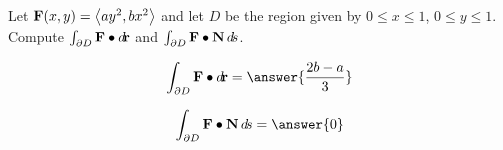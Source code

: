 \documentclass{ximera}
\author{David Guichard \and Neal Koblitz \and H. Jerome Keisler \and Albert Scheller \and Barry Balof \and Mike Wills \and Matthew Carr}
\begin{document}
\begin{exercise}




Let $\mathbf{F}(x,y)=\left\langle ay^2,bx^2\right\rangle$ and let $D$ be the region given by $0\le x\le 1$, $0\le y\le 1$. Compute $\int_{\partial D}\mathbf{F}\bullet\mathop{}\!d\!\mathbf{r}$ and $\int_{\partial D}\mathbf{F}\bullet\mathbf{N}\mathop{}\!d\! s$.
 
\begin{prompt}
\[
\int_{\partial D}\vec{F}\dotp\d\vec{r}=\answer{\frac{2b-a}{3}}
\]
\end{prompt}

\begin{prompt}
\[
\int_{\partial D}\vec{F}\dotp\vec{N}\d s=\answer{0}
\]
\end{prompt}



\end{exercise}
\end{document}
